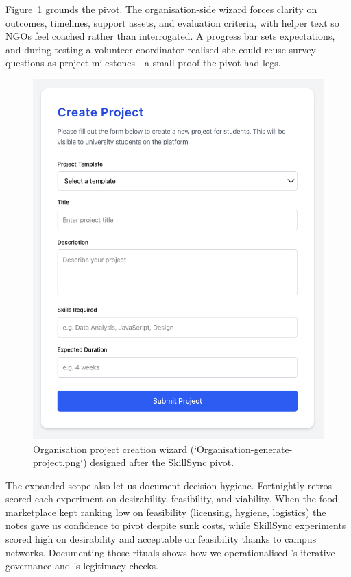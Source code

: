 Figure~\ref{fig:project-creation} grounds the pivot. The organisation-side wizard forces clarity on outcomes, timelines, support assets, and evaluation criteria, with helper text so NGOs feel coached rather than interrogated. A progress bar sets expectations, and during testing a volunteer coordinator realised she could reuse survey questions as project milestones---a small proof the pivot had legs.

\begin{figure}[h]
  \centering
  \includegraphics[width=0.7\linewidth]{figures/Organisation-generate-project.png}
  \caption{Organisation project creation wizard (`Organisation-generate-project.png`) designed after the SkillSync pivot.}
  \label{fig:project-creation}
\end{figure}

The expanded scope also let us document decision hygiene. Fortnightly retros scored each experiment on desirability, feasibility, and viability. When the food marketplace kept ranking low on feasibility (licensing, hygiene, logistics) the notes gave us confidence to pivot despite sunk costs, while SkillSync experiments scored high on desirability and acceptable on feasibility thanks to campus networks. Documenting those rituals shows how we operationalised \citet{Choudary2016}'s iterative governance and \citet{Srnicek2017}'s legitimacy checks.
